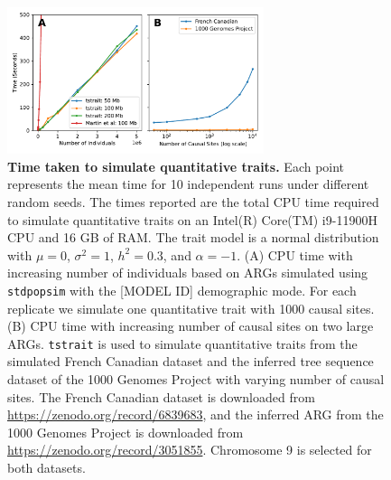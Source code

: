 \documentclass[unnumsec,webpdf,modern,large,namedate]{oup-authoring-template}%
\begin{document}
\begin{figure}[t]%
\centering
\includegraphics[width=213pt]{figures/time-scaling.pdf}
\caption{\textbf{Time taken to simulate quantitative traits.} Each point
represents the mean time for 10 independent runs under different random seeds.
The times reported are the total CPU time required to simulate quantitative
traits on an Intel(R) Core(TM) i9-11900H CPU and 16 GB of RAM. The trait model
is a normal distribution with $\mu=0$, $\sigma^2=1$, $h^2=0.3$, and
$\alpha=-1$. (A) CPU time with increasing number of individuals
based on ARGs simulated using \texttt{stdpopsim} with the [MODEL ID]
demographic mode. For each replicate we simulate
one quantitative trait with 1000 causal sites.
(B) CPU time with increasing number of causal sites on two large ARGs.
\texttt{tstrait} is used to simulate quantitative traits from
the simulated French Canadian dataset \citep{anderson2023} and the inferred
tree sequence dataset of the 1000 Genomes Project \citep{kelleher2019} with
varying number of causal sites. The French Canadian dataset is downloaded from
\url{https://zenodo.org/record/6839683}, and the inferred ARG from the 1000
Genomes Project is downloaded from \url{https://zenodo.org/record/3051855}.
Chromosome 9 is selected for both datasets.}\label{fig:time}
\end{figure}
\end{document}
